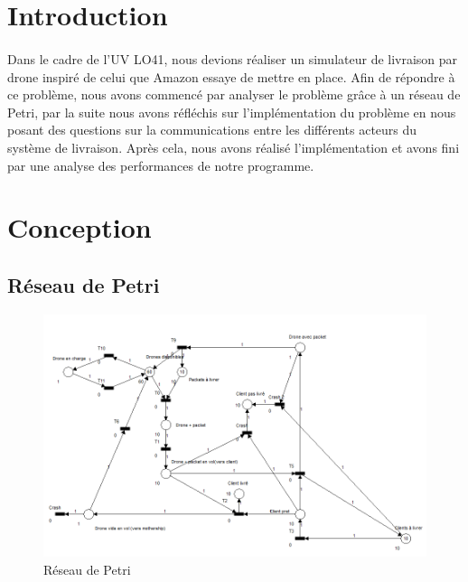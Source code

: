 \documentclass[article, backcover, french, nodocumentinfo]{upmethodology-document}
\begin{document}
	\upmdocumentsummary{}
	\upmdocumentauthors{}
	\upmdocumentinformedpeople{}
	\upmpublicationpage{}
	\thispagestyle{empty}
	\tableofcontents{}
	\newpage{}
	\section*{Introduction}
		\paragraph*{}
			Dans le cadre de l'UV LO41, nous devions réaliser un simulateur de livraison
			par drone inspiré de celui que Amazon essaye de mettre en place. Afin de répondre à ce problème, nous avons commencé par analyser le
			problème grâce à un réseau de Petri, par la suite nous avons réfléchis sur l'implémentation
			du problème en nous posant des questions sur la communications entre les différents
			acteurs du système de livraison. Après cela, nous avons réalisé l'implémentation et
			 avons fini par une analyse des performances de notre programme.
	\section{Conception}
		\subsection{Réseau de Petri}
			\begin{figure}[H]
			  \centering
			  \includegraphics[width=\textwidth]{figures/petri_drones}
			  \caption{Réseau de Petri}
			  \label{fig:petrinet}
			\end{figure}
\end{document}
